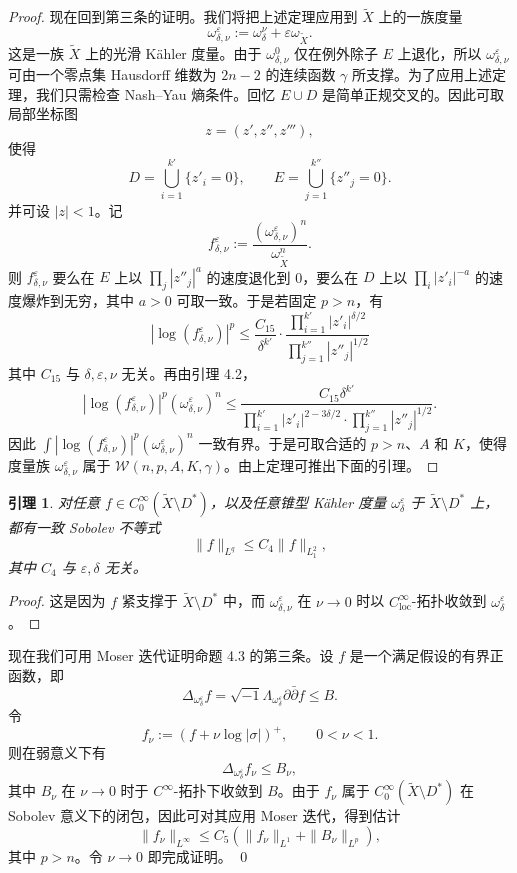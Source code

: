 \documentclass[12pt,a4paper]{article}
\newtheorem{lemma}[theorem]{引理}
\begin{document}
\begin{proof}
现在回到第三条的证明。我们将把上述定理应用到 \(\widetilde X\) 上的一族度量
\[
\omega^\varepsilon_{\delta,\nu}:=\omega^\nu_\delta+\varepsilon\omega_{\widetilde X}.
\]
这是一族 \(\widetilde X\) 上的光滑 Kähler 度量。由于 \(\omega^0_{\delta,\nu}\) 仅在例外除子 \(E\) 上退化，所以 \(\omega^\varepsilon_{\delta,\nu}\) 可由一个零点集 Hausdorff 维数为 \(2n-2\) 的连续函数 \(\gamma\) 所支撑。为了应用上述定理，我们只需检查 Nash--Yau 熵条件。回忆 \(E\cup D\) 是简单正规交叉的。因此可取局部坐标图
\[
z=(z',z'',z'''),
\]
使得
\[
D=\bigcup_{i=1}^{k'}\{z'_i=0\},\qquad
E=\bigcup_{j=1}^{k''}\{z''_j=0\}.
\]
并可设 \(|z|<1\)。记
\[
f^\varepsilon_{\delta,\nu}:=
\frac{(\omega^\varepsilon_{\delta,\nu})^n}{\omega_{\widetilde X}^n}.
\]
则 \(f^\varepsilon_{\delta,\nu}\) 要么在 \(E\) 上以 \(\prod_j |z''_j|^a\) 的速度退化到 0，要么在 \(D\) 上以 \(\prod_i |z'_i|^{-a}\) 的速度爆炸到无穷，其中 \(a>0\) 可取一致。于是若固定 \(p>n\)，有
\[
|\log(f^\varepsilon_{\delta,\nu})|^p
\le
\frac{C_{15}}{\delta^{k'}}
\cdot
\frac{\prod_{i=1}^{k'}|z'_i|^{\delta/2}}
{\prod_{j=1}^{k''}|z''_j|^{1/2}}
\]
其中 \(C_{15}\) 与 \(\delta,\varepsilon,\nu\) 无关。再由引理 4.2，
\[
|\log(f^\varepsilon_{\delta,\nu})|^p(\omega^\varepsilon_{\delta,\nu})^n
\le
\frac{C_{15}\delta^{k'}}
{\prod_{i=1}^{k'}|z'_i|^{2-3\delta/2}\cdot \prod_{j=1}^{k''}|z''_j|^{1/2}}.
\]
因此 \(\int |\log(f^\varepsilon_{\delta,\nu})|^p(\omega^\varepsilon_{\delta,\nu})^n\) 一致有界。于是可取合适的 \(p>n\)、\(A\) 和 \(K\)，使得度量族 \(\omega^\varepsilon_{\delta,\nu}\) 属于 \(\mathcal W(n,p,A,K,\gamma)\)。由上定理可推出下面的引理。
\end{proof}

\begin{lemma}
对任意 \(f\in C_0^\infty(\widetilde X\setminus D^*)\)，以及任意锥型 Kähler 度量 \(\omega^\varepsilon_\delta\) 于 \(\widetilde X\setminus D^*\) 上，都有一致 Sobolev 不等式
\[
\|f\|_{L^q}\le C_4\|f\|_{L_1^2},
\]
其中 \(C_4\) 与 \(\varepsilon,\delta\) 无关。
\end{lemma}

\begin{proof}
这是因为 \(f\) 紧支撑于 \(\widetilde X\setminus D^*\) 中，而 \(\omega^\varepsilon_{\delta,\nu}\) 在 \(\nu\to 0\) 时以 \(C^\infty_{\mathrm{loc}}\)-拓扑收敛到 \(\omega^\varepsilon_\delta\)。
\end{proof}

现在我们可用 Moser 迭代证明命题 4.3 的第三条。设 \(f\) 是一个满足假设的有界正函数，即
\[
\Delta_{\omega^\varepsilon_\delta}f
=
\sqrt{-1}\Lambda_{\omega^\varepsilon_\delta}\partial\bar\partial f
\le B.
\]
令
\[
f_\nu:=(f+\nu\log|\sigma|)^+,\qquad 0<\nu<1.
\]
则在弱意义下有
\[
\Delta_{\omega^\varepsilon_\delta}f_\nu\le B_\nu,
\]
其中 \(B_\nu\) 在 \(\nu\to 0\) 时于 \(C^\infty\)-拓扑下收敛到 \(B\)。由于 \(f_\nu\) 属于 \(C_0^\infty(\widetilde X\setminus D^*)\) 在 Sobolev 意义下的闭包，因此可对其应用 Moser 迭代，得到估计
\[
\|f_\nu\|_{L^\infty}\le C_5(\|f_\nu\|_{L^1}+\|B_\nu\|_{L^p}),
\]
其中 \(p>n\)。令 \(\nu\to 0\) 即完成证明。 \qed
\end{document}
